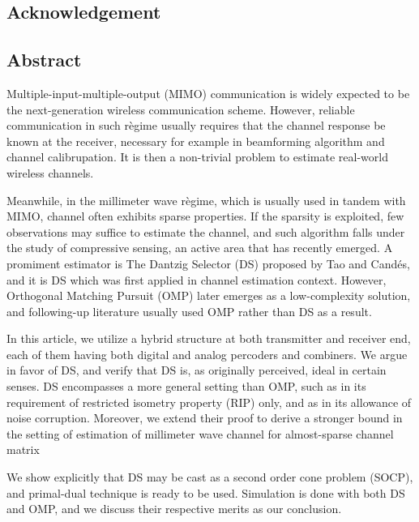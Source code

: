 
\subsection{Acknowledgement}

\subsection{Abstract}

Multiple-input-multiple-output (MIMO) communication is widely expected to be the next-generation wireless communication scheme.
However, reliable communication in such r\`egime usually requires that the channel response be known at the receiver, necessary for example in beamforming algorithm and channel calibrupation.
It is then a non-trivial problem to estimate real-world wireless channels.

Meanwhile, in the millimeter wave r\`egime, which is usually used in tandem with MIMO, channel often exhibits sparse properties.
If the sparsity is exploited, few observations may suffice to estimate the channel, and such algorithm falls under the study of compressive sensing, an active area that has recently emerged.
A promiment estimator is The Dantzig Selector (DS) proposed by Tao and Cand\'es, and it is DS which was first applied in channel estimation context.
However, Orthogonal Matching Pursuit (OMP) later emerges as a low-complexity solution, and following-up literature usually used OMP rather than DS as a result.

In this article, we utilize a hybrid structure at both transmitter and receiver end, each of them having both digital and analog percoders and combiners.
We argue in favor of DS, and verify that DS is, as originally perceived, ideal in certain senses.
DS encompasses a more general setting than OMP, such as in its requirement of restricted isometry property (RIP) only, and as in its allowance of noise corruption.
Moreover, we extend their proof to derive a stronger bound in the setting of estimation of millimeter wave channel for almost-sparse channel matrix

We show explicitly that DS may be cast as a second order cone problem (SOCP), and primal-dual technique is ready to be used.
Simulation is done with both DS and OMP, and we discuss their respective merits as our conclusion.
